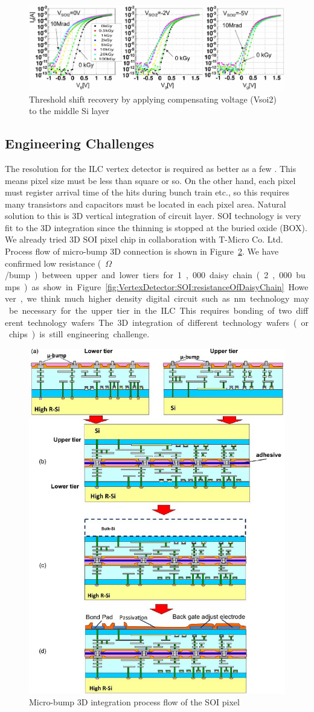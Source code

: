 \begin{figure}
\centering
\includegraphics[width=.5\textwidth]{VertexDetector/SOI/thresholdShift}
\caption{Threshold shift recovery by applying compensating voltage (Vsoi2) to the middle Si layer}
\label{fig:VertexDetector:SOI:thresholdShift}
\end{figure}

\subsection{Engineering Challenges}
The resolution for the ILC vertex detector is required as better as a few \micron. This means pixel size must be less than \unit[20]{\micron} square or so. On the other hand, each pixel must register arrival time of the hits during bunch train etc., so this requires many transistors and capacitors must be located in each pixel area.
Natural solution to this is 3D vertical integration of circuit layer. SOI technology is very fit to the 3D integration since the thinning is stopped at the buried oxide (BOX). We already tried 3D SOI pixel chip in collaboration with T-Micro Co. Ltd. Process flow of micro-bump 3D connection is shown in Figure~\ref{fig:VertexDetector:SOI:microbump3D}. We have confirmed low resistance (~\unit[6]{$\Omega$}/bump) between upper and lower tiers for 1,000 daisy chain (2,000 bumps) as show in Figure~\ref{fig:VertexDetector:SOI:resistanceOfDaisyChain}.
However, we think much higher density digital circuit such as \unit[32]{nm} technology may be necessary for the upper tier in the ILC. This requires bonding of two different technology wafers. The 3D integration of different technology wafers (or chips) is still engineering challenge.

\begin{figure}
\centering
\includegraphics[width=.5\textwidth]{VertexDetector/SOI/microBump3DIntegration}
\caption{Micro-bump 3D integration process flow of the SOI pixel}
\label{fig:VertexDetector:SOI:microbump3D}
\end{figure}

